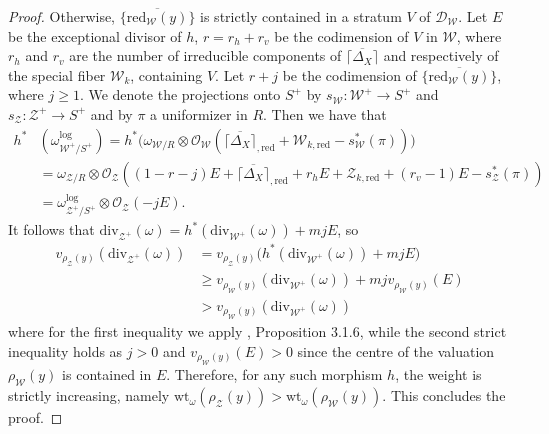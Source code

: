 \documentclass{amsart}%
\numberwithin{equation}{subsection}
\theoremstyle{plain2}
\theoremstyle{definition2}
\theoremstyle{stepstyle}
\theoremstyle{point}
\theoremstyle{subpoint}
\newcommand{\D}{{\mathcal D}}
\newcommand{\caO}{\ensuremath{\mathcal{O}}}
\newcommand{\cZ}{\ensuremath{\mathscr{Z}}}
\newcommand{\cW}{\ensuremath{\mathscr{W}}}
\newcommand{\redu}{\mathrm{red}}
\newcommand{\divisor}{\mathrm{div}}
\newcommand{\weight}{\mathrm{wt}}
\begin{document}
\begin{proof}
Otherwise, $\overline{ \{\redu_{\cW}(y)\}}$ is strictly contained in a stratum $V$ of $\D_\cW$. Let $E$ be the exceptional divisor of $h$, $r=r_h +r_v$ be the codimension of $V$ in $\cW$, where $r_h$ and $r_v$ are the number of irreducible components of $\overline{\lceil\Delta_X \rceil}$ and respectively of the special fiber $\cW_k$, containing $V$. Let $r+j$ be the codimension of $\overline{ \{\redu_{\cW}(y)\}}$, where $j \geqslant 1$. We denote the projections onto $S^+$ by $s_{\cW}:\cW^+\rightarrow S^+$ and $s_{\cZ}:\cZ^+ \rightarrow S^+$ and by $\pi$ a uniformizer in $R$. Then we have that
\begin{align*}
h^*&(\omega^{\log}_{\cW^+/S^+}) = h^* \big(\omega_{\cW/R} \otimes \caO_{\cW}(\overline{\lceil\Delta_X \rceil}_{,\redu} + \cW_{k,\redu} - s_\cW^*(\pi)) \big) \\
& = \omega_{\cZ/R}\otimes \caO_{\cZ}((1-r-j)E +\overline{\lceil\Delta_X \rceil}_{,\redu} + r_hE+ \cZ_{k,\redu} + (r_v-1)E - s_\cZ^*(\pi))\\
& = \omega^{\log}_{\cZ^+/S^+} \otimes \caO_{\cZ}(-j E).
\end{align*} It follows that $\divisor_{\cZ^+}(\omega)= h^*(\divisor_{\cW^+}(\omega)) + mjE$, so
\begin{align*}
v_{\rho_\cZ(y)}(\divisor_{\cZ^+}(\omega))& = v_{\rho_\cZ(y)}\big(h^*(\divisor_{\cW^+}(\omega)) + mjE\big)  \\ & \geqslant v_{\rho_\cW(y)}(\divisor_{\cW^+}(\omega)) + mj v_{\rho_\cW(y)}(E) \\ & > v_{\rho_\cW(y)}(\divisor_{\cW^+}(\omega))
\end{align*} where for the first inequality we apply \cite{MustataNicaise}, Proposition 3.1.6, while the second strict inequality holds as $j >0$ and  $v_{\rho_\cW(y)}(E) >0 $ since the centre of the valuation $\rho_\cW(y)$ is contained in $E$. Therefore, for any such morphism $h$, the weight is strictly increasing, namely $\weight_{\omega}(\rho_\cZ(y)) > \weight_{\omega} (\rho_\cW(y))$. This concludes the proof.
\end{proof}
\end{document}
